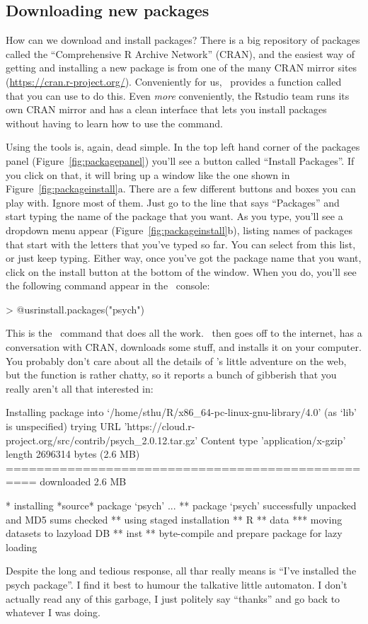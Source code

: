 \subsection{Downloading new packages}

How can we download and install packages? There is a big repository of packages called the ``Comprehensive R Archive Network'' (CRAN), and the easiest way of getting and installing a new package is from one of the many CRAN mirror sites (\url{https://cran.r-project.org/}). Conveniently for us, \R\ provides a function called  that you can use to do this. Even {\it more} conveniently, the Rstudio team runs its own CRAN mirror and \Rstudio has a clean interface that lets you install packages without having to learn how to use the  command.

Using the \Rstudio tools is, again, dead simple. In the top left hand corner of the packages panel (Figure~\ref{fig:packagepanel}) you'll see a button called ``Install Packages''. If you click on that, it will bring up a window like the one shown in Figure~\ref{fig:packageinstall}a. There are a few different buttons and boxes you can play with. Ignore most of them. Just go to the line that says ``Packages'' and start typing the name of the package that you want. As you type, you'll see a dropdown menu appear (Figure~\ref{fig:packageinstall}b), listing names of packages that start with the letters that you've typed so far. You can select from this list, or just keep typing. Either way, once you've got the package name that you want, click on the install button at the bottom of the window. When you do, you'll see the following command appear in the \R\ console:
\begin{rblock1}
> @usr{install.packages("psych")}
\end{rblock1}
This is the \R\ command that does all the work. \R\ then goes off to the internet, has a conversation with CRAN, downloads some stuff, and installs it on your computer. You probably don't care about all the details of \R's little adventure on the web, but the  function is rather chatty, so it reports a bunch of gibberish that you really aren't all that interested in:
\begin{rblock1}
Installing package into ‘/home/sthu/R/x86_64-pc-linux-gnu-library/4.0’
(as ‘lib’ is unspecified)
trying URL 'https://cloud.r-project.org/src/contrib/psych_2.0.12.tar.gz'
Content type 'application/x-gzip' length 2696314 bytes (2.6 MB)
==================================================
downloaded 2.6 MB

* installing *source* package ‘psych’ ...
** package ‘psych’ successfully unpacked and MD5 sums checked
** using staged installation
** R
** data
*** moving datasets to lazyload DB
** inst
** byte-compile and prepare package for lazy loading
\end{rblock1}
Despite the long and tedious response, all thar really means is ``I've installed the psych package''. I find it best to humour the talkative little automaton. I don't actually read any of this garbage, I just politely say ``thanks'' and go back to whatever I was doing.  


